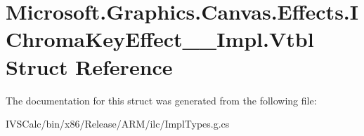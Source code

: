 \hypertarget{struct_microsoft_1_1_graphics_1_1_canvas_1_1_effects_1_1_i_chroma_key_effect_____impl_1_1_vtbl}{}\section{Microsoft.\+Graphics.\+Canvas.\+Effects.\+I\+Chroma\+Key\+Effect\+\_\+\+\_\+\+Impl.\+Vtbl Struct Reference}
\label{struct_microsoft_1_1_graphics_1_1_canvas_1_1_effects_1_1_i_chroma_key_effect_____impl_1_1_vtbl}


The documentation for this struct was generated from the following file\+:\begin{DoxyCompactItemize}
\item 
I\+V\+S\+Calc/bin/x86/\+Release/\+A\+R\+M/ilc/Impl\+Types.\+g.\+cs\end{DoxyCompactItemize}

